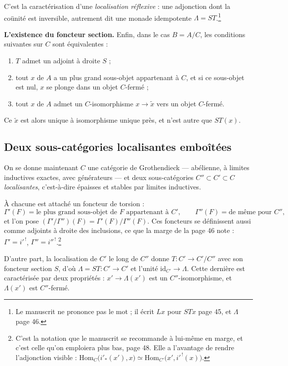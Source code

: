 \documentclass[11pt,a4paper]{article}
\begin{document}
C'est la caractérisation d'une \emph{localisation réflexive} : une adjonction
dont la coünité est inversible, autrement dit une monade idempotente
$\Lambda = ST$.\footnote{Le manuscrit ne prononce pas le mot ; il écrit
$Lx$ pour $ST x$ page 45, et $\Lambda$ page 46.}


\textbf{L'existence du foncteur section.} Enfin, dans le cas $B = A/C$, les
conditions suivantes sur $C$ sont équivalentes :

\begin{enumerate}
\item[a)] $T$ admet un adjoint à droite $S$ ;
\item[b)] tout $x$ de $A$ a un plus grand sous-objet appartenant à $C$, et si
ce sous-objet est nul, $x$ se plonge dans un objet $C$-fermé ;
\item[c)] tout $x$ de $A$ admet un $C$-isomorphisme $x \to \widetilde{x}$ vers
un objet $C$-fermé.
\end{enumerate}

Ce $\widetilde{x}$ est alors unique à isomorphisme unique près, et n'est autre
que $ST(x)$.

\subsection*{Deux sous-catégories localisantes emboîtées}

On se donne maintenant $C$ une catégorie de Grothendieck — abélienne, à limites
inductives exactes, avec générateurs — et deux sous-catégories
$C'' \subset C' \subset C$ \emph{localisantes}, c'est-à-dire épaisses et
stables par limites inductives.

À chacune est attaché un foncteur de torsion :
\[
  \Gamma'(F) = \text{le plus grand sous-objet de } F \text{ appartenant à }
  C' , \qquad \Gamma''(F) = \text{de même pour } C'' ,
\]
et l'on pose $(\Gamma'/\Gamma'')(F) = \Gamma'(F)/\Gamma''(F)$. Ces foncteurs se
définissent aussi comme adjoints à droite des inclusions, ce que la marge de la
page 46 note : $\Gamma' = i'^{\,!}$, $\Gamma'' = i''^{\,!}$.\footnote{C'est la
notation que le manuscrit se recommande à lui-même en marge, et c'est celle
qu'on emploiera plus bas, page 48. Elle a l'avantage de rendre l'adjonction
visible : $\mathrm{Hom}_{C}\bigl( i'_{*}(x'), x \bigr) \simeq
\mathrm{Hom}_{C'}\bigl( x', i'^{\,!}(x) \bigr)$.}

D'autre part, la localisation de $C'$ le long de $C''$ donne
$T : C' \to C'/C''$ avec son foncteur section $S$, d'où
$\Lambda = ST : C' \to C'$ et l'unité $\mathrm{id}_{C'} \to \Lambda$. Cette
dernière est caractérisée par deux propriétés : $x' \to \Lambda(x')$ est un
$C''$-isomorphisme, et $\Lambda(x')$ est $C''$-fermé.
\end{document}
